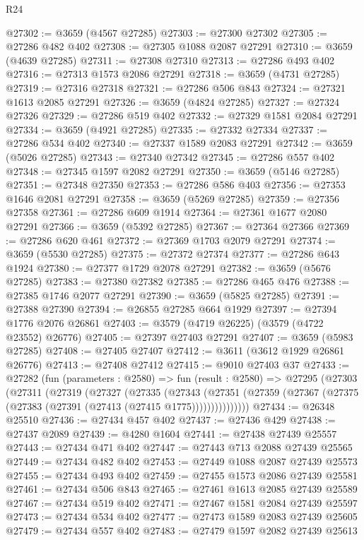 \begin{lexlean}{R24}
\begin{coremodule}
@27302 := @3659 (@4567 @27285)
@27303 := @27300 @27302
@27305 := @27286 @482 @402
@27308 := @27305 @1088 @2087 @27291
@27310 := @3659 (@4639 @27285)
@27311 := @27308 @27310
@27313 := @27286 @493 @402
@27316 := @27313 @1573 @2086 @27291
@27318 := @3659 (@4731 @27285)
@27319 := @27316 @27318
@27321 := @27286 @506 @843
@27324 := @27321 @1613 @2085 @27291
@27326 := @3659 (@4824 @27285)
@27327 := @27324 @27326
@27329 := @27286 @519 @402
@27332 := @27329 @1581 @2084 @27291
@27334 := @3659 (@4921 @27285)
@27335 := @27332 @27334
@27337 := @27286 @534 @402
@27340 := @27337 @1589 @2083 @27291
@27342 := @3659 (@5026 @27285)
@27343 := @27340 @27342
@27345 := @27286 @557 @402
@27348 := @27345 @1597 @2082 @27291
@27350 := @3659 (@5146 @27285)
@27351 := @27348 @27350
@27353 := @27286 @586 @403
@27356 := @27353 @1646 @2081 @27291
@27358 := @3659 (@5269 @27285)
@27359 := @27356 @27358
@27361 := @27286 @609 @1914
@27364 := @27361 @1677 @2080 @27291
@27366 := @3659 (@5392 @27285)
@27367 := @27364 @27366
@27369 := @27286 @620 @461
@27372 := @27369 @1703 @2079 @27291
@27374 := @3659 (@5530 @27285)
@27375 := @27372 @27374
@27377 := @27286 @643 @1924
@27380 := @27377 @1729 @2078 @27291
@27382 := @3659 (@5676 @27285)
@27383 := @27380 @27382
@27385 := @27286 @465 @476
@27388 := @27385 @1746 @2077 @27291
@27390 := @3659 (@5825 @27285)
@27391 := @27388 @27390
@27394 := @26855 @27285 @664 @1929
@27397 := @27394 @1776 @2076 @26861
@27403 := @3579 (@4719 @26225) (@3579 (@4722 @23552) @26776)
@27405 := @27397 @27403 @27291
@27407 := @3659 (@5983 @27285)
@27408 := @27405 @27407
@27412 := @3611 (@3612 @1929 @26861 @26776)
@27413 := @27408 @27412
@27415 := @9010 @27403 @37
@27433 := @27282
    (fun (parameters : @2580) =>
    fun (result : @2580) =>
    @27295
      (@27303
        (@27311
          (@27319
            (@27327
              (@27335
                (@27343
                  (@27351
                    (@27359 (@27367 (@27375 (@27383 (@27391 (@27413 (@27415 @1775)))))))))))))))
@27434 := @26348 @25510
@27436 := @27434 @457 @402
@27437 := @27436 @429
@27438 := @27437 @2089
@27439 := @4280 @1604
@27441 := @27438 @27439 @25557
@27443 := @27434 @471 @402
@27447 := @27443 @713 @2088 @27439 @25565
@27449 := @27434 @482 @402
@27453 := @27449 @1088 @2087 @27439 @25573
@27455 := @27434 @493 @402
@27459 := @27455 @1573 @2086 @27439 @25581
@27461 := @27434 @506 @843
@27465 := @27461 @1613 @2085 @27439 @25589
@27467 := @27434 @519 @402
@27471 := @27467 @1581 @2084 @27439 @25597
@27473 := @27434 @534 @402
@27477 := @27473 @1589 @2083 @27439 @25605
@27479 := @27434 @557 @402
@27483 := @27479 @1597 @2082 @27439 @25613

\end{coremodule}
\end{lexlean}
